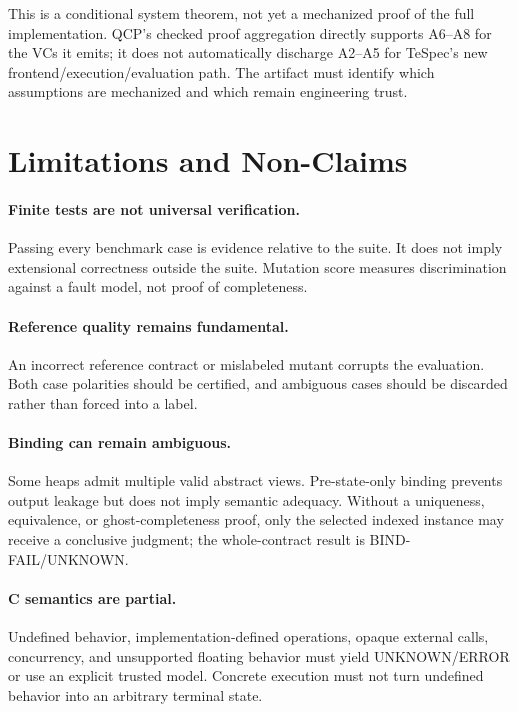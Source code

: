 \documentclass[10pt]{article}
\newcommand{\unknown}{\textsf{UNKNOWN}}
\newcommand{\error}{\textsf{ERROR}}
\newcommand{\bindfail}{\textsf{BIND-FAIL}}
\begin{document}
This is a conditional system theorem, not yet a mechanized proof of the full
implementation.  QCP's checked proof aggregation directly supports A6--A8
for the VCs it emits; it does not automatically discharge A2--A5 for TeSpec's
new frontend/execution/evaluation path.  The artifact must identify which
assumptions are mechanized and which remain engineering trust.

\section{Limitations and Non-Claims}
\label{sec:limitations}

\paragraph{Finite tests are not universal verification.}
Passing every benchmark case is evidence relative to the suite.  It does not
imply extensional correctness outside the suite.  Mutation score measures
discrimination against a fault model, not proof of completeness.

\paragraph{Reference quality remains fundamental.}
An incorrect reference contract or mislabeled mutant corrupts the evaluation.
Both case polarities should be certified, and ambiguous cases should be
discarded rather than forced into a label.

\paragraph{Binding can remain ambiguous.}
Some heaps admit multiple valid abstract views.  Pre-state-only binding prevents
output leakage but does not imply semantic adequacy.  Without a uniqueness,
equivalence, or ghost-completeness proof, only the selected indexed instance
may receive a conclusive judgment; the whole-contract result is
\bindfail{}/\unknown.

\paragraph{C semantics are partial.}
Undefined behavior, implementation-defined operations, opaque external calls,
concurrency, and unsupported floating behavior must yield \unknown/\error{} or
use an explicit trusted model.  Concrete execution must not turn undefined
behavior into an arbitrary terminal state.
\end{document}
